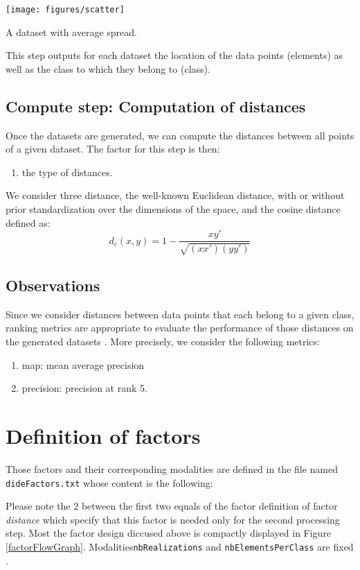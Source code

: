 \documentclass[12pt,a4paper,fleqn]{tufte-handout}
\begin{document}
\begin{marginfigure}
\texttt{[image: figures/scatter]}
\caption{A dataset with average spread.}
\label{scatter}
\end{marginfigure}

This step outputs for each dataset the location of the data points (elements) as well as the class to which they belong to (class).

\subsection{\textbf{Compute step}: Computation of distances}

Once the datasets are generated, we can compute the distances between all points of a given dataset. The factor for this step is then:
\begin{enumerate}
\item the type of distances.
\end{enumerate}

We consider three distance, the well-known Euclidean distance, with or without prior standardization over the dimensions of the space, and the cosine distance defined as:
$$
d_c(x, y) = 1-\frac{xy'}{\sqrt{(xx')(yy')}}
$$

\subsection{Observations}

Since we consider distances between data points that each belong to a given class, ranking metrics are appropriate to evaluate the performance of those distances on the generated datasets \cite{manning2008introduction}. More precisely, we consider the following metrics:
\begin{enumerate}
\item map: mean average precision
\item precision: precision at rank 5.
\end{enumerate}

\section{Definition of factors}

Those factors and their corresponding modalities are defined in the file named \texttt{dideFactors.txt} whose content is the following:


Please note the 2 between the first two equals of the factor definition of factor \textit{distance} which specify that this factor is needed only for the second processing step. Most the factor design diccused above is compactly displayed in Figure \ref{factorFlowGraph}. Modalities\texttt{nbRealizations} and \texttt{nbElementsPerClass} are fixed .
\end{document}
